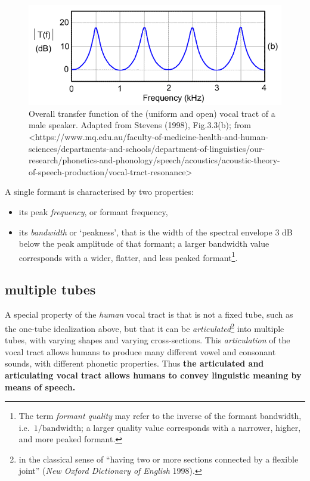 \documentclass[
]{book}
\begin{document}
\begin{figure}

{\centering \includegraphics{figures/formants_stevens01_b} 

}

\caption{Overall transfer function of the (uniform and open) vocal tract of a male speaker. Adapted from Stevens (1998), Fig.3.3(b); from <https://www.mq.edu.au/faculty-of-medicine-health-and-human-sciences/departments-and-schools/department-of-linguistics/our-research/phonetics-and-phonology/speech/acoustics/acoustic-theory-of-speech-production/vocal-tract-resonance>}\label{fig:uniform-vt-transfer}
\end{figure}

A single formant is characterised by two properties:

\begin{itemize}
\item
  its peak \emph{frequency}, or formant frequency,
\item
  its \emph{bandwidth} or `peakness', that is the width of the spectral envelope \(3\) dB below the peak amplitude of that formant; a larger bandwidth value corresponds with a wider, flatter, and less peaked formant\footnote{The term \emph{formant quality} may refer to the inverse of the formant bandwidth, i.e.~\(1/\textrm{bandwidth}\); a larger quality value corresponds with a narrower, higher, and more peaked formant.}.
\end{itemize}

\subsection{multiple tubes}\label{sec:moretubes}

A special property of the \emph{human} vocal tract is that is not a fixed tube, such as the one-tube idealization above, but that it can be \emph{articulated}\footnote{in the classical sense of ``having two or more sections connected by a flexible joint'' (\emph{New Oxford Dictionary of English} 1998).} into multiple tubes, with varying shapes and varying cross-sections. This \emph{articulation} of the vocal tract allows humans to produce many different vowel and consonant sounds, with different phonetic properties. Thus \textbf{the articulated and articulating vocal tract allows humans to convey linguistic meaning by means of speech.}
\end{document}
